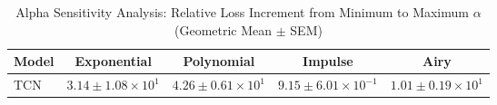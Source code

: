 
\begin{table}[h]
\centering
\caption{Alpha Sensitivity Analysis: Relative Loss Increment from Minimum to Maximum $\alpha$ (Geometric Mean $\pm$ SEM)}
\label{tab:alpha_sensitivity}
\begin{tabular}{lcccc}
\hline
Model & Exponential & Polynomial & Impulse & Airy \\
\hline
TCN & $3.14 \pm 1.08 \times 10^{1}$ & $4.26 \pm 0.61 \times 10^{1}$ & $9.15 \pm 6.01 \times 10^{-1}$ & $1.01 \pm 0.19 \times 10^{1}$ \\
\hline
\end{tabular}
\end{table}
